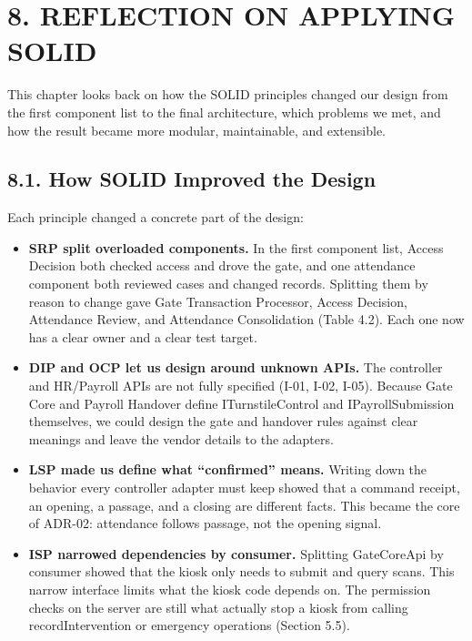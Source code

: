 \section*{8. REFLECTION ON APPLYING SOLID}

{}

This chapter looks back on how the SOLID principles changed our design from the first component list to the final architecture, which problems we met, and how the result became more modular, maintainable, and extensible.

\subsection*{8.1. How SOLID Improved the Design}

{}


Each principle changed a concrete part of the design:

\begin{itemize}[leftmargin=36pt, itemsep=2pt, topsep=4pt, parsep=2pt]
  \item \textbf{SRP split overloaded components.} In the first component list, Access Decision both checked access and drove the gate, and one attendance component both reviewed cases and changed records. Splitting them by reason to change gave Gate Transaction Processor, Access Decision, Attendance Review, and Attendance Consolidation (Table 4.2). Each one now has a clear owner and a clear test target.
  \item \textbf{DIP and OCP let us design around unknown APIs.} The controller and HR/Payroll APIs are not fully specified (I-01, I-02, I-05). Because Gate Core and Payroll Handover define ITurnstileControl and IPayrollSubmission themselves, we could design the gate and handover rules against clear meanings and leave the vendor details to the adapters.
  \item \textbf{LSP made us define what ``confirmed'' means.} Writing down the behavior every controller adapter must keep showed that a command receipt, an opening, a passage, and a closing are different facts. This became the core of ADR-02: attendance follows passage, not the opening signal.
  \item \textbf{ISP narrowed dependencies by consumer.} Splitting GateCoreApi by consumer showed that the kiosk only needs to submit and query scans. This narrow interface limits what the kiosk code depends on. The permission checks on the server are still what actually stop a kiosk from calling recordIntervention or emergency operations (Section 5.5).
\end{itemize}

